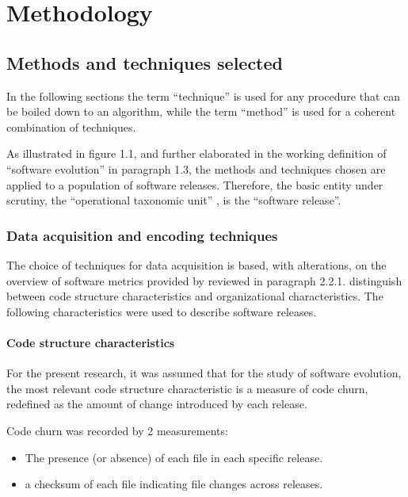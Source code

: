 
\chapter{Methodology} %

\label{Chapter3} %


\section{Methods and techniques selected}
In the following sections the term “technique” is used for any procedure that can be boiled down to an algorithm, while the term “method” is used for a coherent combination of techniques.

As illustrated in figure 1.1, and further elaborated in the working definition of “software evolution” in paragraph 1.3, the methods and techniques chosen are applied to a population of software releases. Therefore, the basic entity under scrutiny, the “operational taxonomic unit” \citep{Sokal1986a}, is the “software release”.

\subsection{Data acquisition and encoding techniques}

The choice of techniques for data acquisition is based, with alterations, on the overview of software metrics provided by \citet{Nagappan2008a} reviewed in paragraph 2.2.1. \citet{Nagappan2008a} distinguish between code structure characteristics and organizational characteristics. The following characteristics were used to describe software releases.

\subsubsection{Code structure characteristics}
For the present research, it was assumed that for the study of software evolution, the most relevant code structure characteristic is a measure of code churn, redefined as the amount of change introduced by each release.

\noindent
Code churn was recorded by 2 measurements: 
\begin{itemize}
\item{The presence (or absence) of each file in each specific release.}
\item{a checksum of each file indicating file changes across releases.}
\end{itemize}

